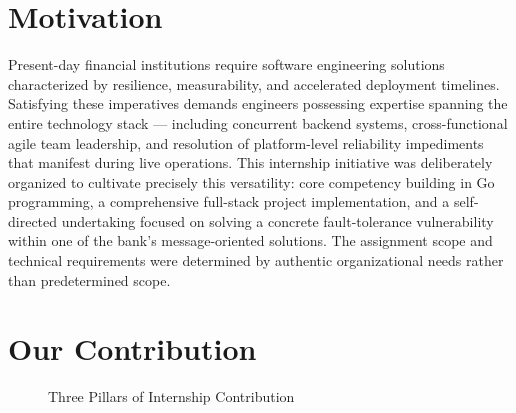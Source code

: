 \section{Motivation}

Present-day financial institutions require software engineering solutions characterized 
by resilience, measurability, and accelerated deployment timelines. Satisfying these 
imperatives demands engineers possessing expertise spanning the entire technology stack --- 
including concurrent backend systems, cross-functional agile team leadership, and resolution 
of platform-level reliability impediments that manifest during live operations. This internship 
initiative was deliberately organized to cultivate precisely this versatility: core competency 
building in Go programming, a comprehensive full-stack project implementation, and a 
self-directed undertaking focused on solving a concrete fault-tolerance vulnerability 
within one of the bank's message-oriented solutions. The assignment scope and technical 
requirements were determined by authentic organizational needs rather than predetermined scope.

\section{Our Contribution}

\begin{figure}[H]
\centering
{}
\caption{Three Pillars of Internship Contribution}
\end{figure}

